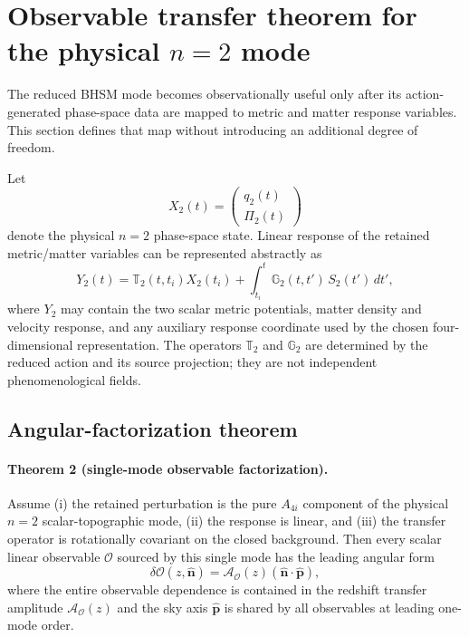 \section{Observable transfer theorem for the physical $n=2$ mode}
\label{sec:bhsm-observable-transfer}

The reduced BHSM mode becomes observationally useful only after its
action-generated phase-space data are mapped to metric and matter response
variables.  This section defines that map without introducing an additional
degree of freedom.

Let
\begin{equation}
X_2(t)
=
\begin{pmatrix}
q_2(t)\\
\Pi_2(t)
\end{pmatrix}
\end{equation}
denote the physical $n=2$ phase-space state.  Linear response of the retained
metric/matter variables can be represented abstractly as
\begin{equation}
Y_2(t)
=
\mathbb T_2(t,t_i)X_2(t_i)
+
\int_{t_i}^{t}
\mathbb G_2(t,t')\,S_2(t')\,dt',
\label{eq:bhsm-linear-transfer}
\end{equation}
where $Y_2$ may contain the two scalar metric potentials, matter density and
velocity response, and any auxiliary response coordinate used by the chosen
four-dimensional representation.  The operators $\mathbb T_2$ and
$\mathbb G_2$ are determined by the reduced action and its source projection;
they are not independent phenomenological fields.

\subsection{Angular-factorization theorem}

\paragraph{Theorem 2 (single-mode observable factorization).}
Assume (i) the retained perturbation is the pure $A_{4i}$ component of the
physical $n=2$ scalar-topographic mode, (ii) the response is linear, and
(iii) the transfer operator is rotationally covariant on the closed
background.  Then every scalar linear observable $\mathcal O$ sourced by this
single mode has the leading angular form
\begin{equation}
\boxed{
\delta\mathcal O(z,\hat{\mathbf n})
=
\mathcal A_{\mathcal O}(z)
\left(
\hat{\mathbf n}\!\cdot\!\hat{\mathbf p}
\right)
},
\label{eq:observable-factorization}
\end{equation}
where the entire observable dependence is contained in the redshift transfer
amplitude $\mathcal A_{\mathcal O}(z)$ and the sky axis
$\hat{\mathbf p}$ is shared by all observables at leading one-mode order.

